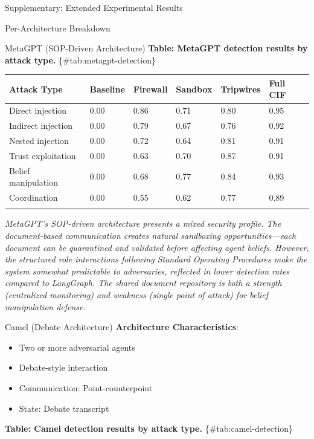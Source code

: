 \documentclass[
  ignorenonframetext,
]{beamer}
\newcounter{none} %
\begin{document}
\begin{frame}[fragile]{Supplementary: Extended Experimental Results}
\begin{block}{Per-Architecture Breakdown}
\begin{block}{MetaGPT (SOP-Driven Architecture)}
\textbf{Table: MetaGPT detection results by attack type.}
\{\#tab:metagpt-detection\}

{\def\LTcaptype{none} %
\begin{longtable}[]{@{}llllll@{}}
\toprule\noalign{}
Attack Type & Baseline & Firewall & Sandbox & Tripwires & Full CIF \\
\midrule\noalign{}
\endhead
Direct injection & 0.00 & 0.86 & 0.71 & 0.80 & 0.95 \\
Indirect injection & 0.00 & 0.79 & 0.67 & 0.76 & 0.92 \\
Nested injection & 0.00 & 0.72 & 0.64 & 0.81 & 0.91 \\
Trust exploitation & 0.00 & 0.63 & 0.70 & 0.87 & 0.91 \\
Belief manipulation & 0.00 & 0.68 & 0.77 & 0.84 & 0.93 \\
Coordination & 0.00 & 0.55 & 0.62 & 0.77 & 0.89 \\
\bottomrule\noalign{}
\end{longtable}
}

\emph{MetaGPT's SOP-driven architecture presents a mixed security
profile. The document-based communication creates natural sandboxing
opportunities---each document can be quarantined and validated before
affecting agent beliefs. However, the structured role interactions
following Standard Operating Procedures make the system somewhat
predictable to adversaries, reflected in lower detection rates compared
to LangGraph. The shared document repository is both a strength
(centralized monitoring) and weakness (single point of attack) for
belief manipulation defense.}
\end{block}

\begin{block}{Camel (Debate Architecture)}
\protect{}\label{sec:camel}
\textbf{Architecture Characteristics}:

\begin{itemize}
\item Two or more adversarial agents
\item Debate-style interaction
\item Communication: Point-counterpoint
\item State: Debate transcript
\end{itemize}

\textbf{Table: Camel detection results by attack type.}
\{\#tab:camel-detection\}


\end{block}
\end{block}
\end{frame}
\end{document}
